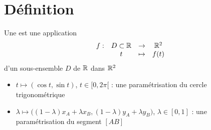 \section{Définition}

\begin{frame}

\begin{mydefinition}
Une  est une application 
$$\begin{array}[t]{cccc}
f :&D\subset\mathbb{R}&\rightarrow&\mathbb{R}^2\\
 &t&\mapsto&f(t)
\end{array}$$ d'un sous-ensemble $D$ de $\mathbb{R}$ dans $\mathbb{R}^2$ 
\end{mydefinition}

\pause


\end{frame}

\begin{frame}

\begin{exemple}
\begin{itemize}
\item $t\mapsto (\cos t,\sin t)$, $t\in[0,2\pi[$ : une paramétrisation du cercle trigonométrique


\end{itemize}
\vspace*{-2ex}
\vspace*{-3ex}
\end{exemple}


\end{frame}

\begin{frame}

\begin{exemple}
\begin{itemize}	
\item $\lambda\mapsto\big((1-\lambda)x_A+\lambda x_B,(1-\lambda)y_A+\lambda y_B\big)$, 
$\lambda\in[0,1]$ : une paramétrisation du segment $[AB]$

\end{itemize} 
\vspace*{-2ex}


\end{exemple}
\end{frame}


